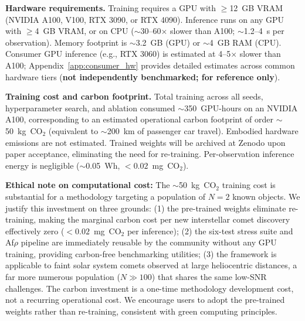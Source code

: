 \documentclass[usenatbib]{mnras}
\begin{document}
\textbf{Hardware requirements.} Training requires a GPU with $\geq$12~GB VRAM (NVIDIA A100, V100, RTX 3090, or RTX 4090). Inference runs on any GPU with $\geq$4~GB VRAM, or on CPU ($\sim$30--60$\times$ slower than A100; $\sim$1.2--4~s per observation). Memory footprint is $\sim$3.2~GB (GPU) or $\sim$4~GB RAM (CPU). Consumer GPU inference (e.g., RTX 3060) is estimated at 4--5$\times$ slower than A100; Appendix~\ref{app:consumer_hw} provides detailed estimates across common hardware tiers (\textbf{not independently benchmarked; for reference only}).

\textbf{Training cost and carbon footprint.} Total training across all seeds, hyperparameter search, and ablation consumed $\sim$350~GPU-hours on an NVIDIA A100, corresponding to an estimated operational carbon footprint of order $\sim$50~kg~CO$_2$ (equivalent to $\sim$200~km of passenger car travel). Embodied hardware emissions are not estimated. Trained weights will be archived at Zenodo upon paper acceptance, eliminating the need for re-training. Per-observation inference energy is negligible ($\sim$0.05~Wh, $<0.02$~mg~CO$_2$).

\textbf{Ethical note on computational cost:} The $\sim$50~kg~CO$_2$ training cost is substantial for a methodology targeting a population of $N=2$ known objects. We justify this investment on three grounds: (1) the pre-trained weights eliminate re-training, making the marginal carbon cost per new interstellar comet discovery effectively zero ($<0.02$~mg~CO$_2$ per inference); (2) the six-test stress suite and Af$\rho$ pipeline are immediately reusable by the community without any GPU training, providing carbon-free benchmarking utilities; (3) the framework is applicable to faint solar system comets observed at large heliocentric distances, a far more numerous population ($N \gg 100$) that shares the same low-SNR challenges. The carbon investment is a one-time methodology development cost, not a recurring operational cost. We encourage users to adopt the pre-trained weights rather than re-training, consistent with green computing principles.
\end{document}
